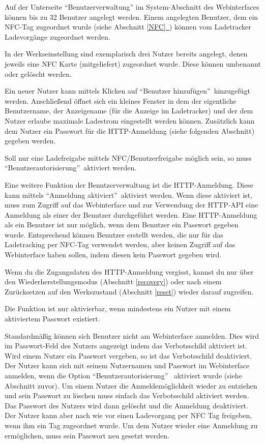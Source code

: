 \documentclass[a4paper,10pt]{article}
\newcommand{\hint}[1]{\begin{tcolorbox}[colback=boxgray,colframe=black,coltext=
white,title=Hinweis,left*=2mm,right*=2mm,boxsep=1mm,bottom=1mm,top=1mm]#1\end{tcolorbox}}
\newcommand*{\fullref}[1]{Abschnitt \hyperref[{#1}]{\ref*{#1}~\nameref*{#1}}}
\begin{document}
\begin{multicols*}{2}
    Auf der Unterseite \enquote{Benutzerverwaltung} im System-Abschnitt des Webinterfaces können bis zu 32 Benutzer angelegt werden.
    Einem angelegten Benutzer, dem ein NFC-Tag zugeordnet wurde (siehe \fullref{NFC}) können vom Ladetracker Ladevorgänge zugeordnet werden.

    In der Werkseinstellung sind exemplarisch drei Nutzer bereits angelegt,
    denen jeweils eine NFC Karte (mitgeliefert) zugeordnet wurde. Diese können
    umbenannt oder gelöscht werden.

    Ein neuer Nutzer kann mittels Klicken auf \enquote{Benutzer hinzufügen}~hinzugefügt werden.
    Anschließend öffnet sich ein kleines Fenster in dem der eigentliche Benutzername, der Anzeigename (für die Anzeige im Ladetracker)
    und der dem Nutzer erlaube maximale Ladestrom eingestellt werden können.
    Zusätzlich kann dem Nutzer ein Passwort für die HTTP-Anmeldung (siehe
    folgenden Abschnitt) gegeben werden.

    Soll nur eine Ladefreigabe mittels NFC/Benutzerfreigabe möglich sein, so
    muss \enquote{Benutzerautorisierung}~aktiviert werden.

    Eine weitere Funktion der Benutzerverwaltung ist die HTTP-Anmeldung. Diese
    kann mittels \enquote{Anmeldung aktiviert}~aktiviert werden. Wenn diese aktiviert ist, muss zum Zugriff auf das Webinterface und zur Verwendung
    der HTTP-API eine Anmeldung als einer der Benutzer durchgeführt werden. Eine HTTP-Anmeldung als ein Benutzer ist nur möglich, wenn
    dem Benutzer ein Passwort gegeben wurde. Entsprechend können Benutzer erstellt werden, die nur für das Ladetracking per NFC-Tag
    verwendet werden, aber keinen Zugriff auf das Webinterface haben sollen,
	indem diesen kein Passwort gegeben wird.
    \hint{Wenn du die Zugangsdaten des HTTP-Anmeldung vergisst, kannst du nur
    über den Wiederherstellungsmodus (Abschnitt \ref{recovery}) oder nach einem
    Zurücksetzen auf den Werkszustand (Abschnitt \ref{reset}) wieder darauf zugreifen.}
    Die Funktion ist nur aktivierbar, wenn mindestens ein Nutzer mit einem
    aktiviertem Passwort existiert.

    Standardmäßig können sich Benutzer nicht am Webinterface anmelden. Dies wird
    im Passwort-Feld des Nutzers angezeigt indem das Verbotsschild aktiviert
    ist. Wird einem Nutzer ein Passwort vergeben, so ist das Verbotsschild
    deaktiviert. Der Nutzer kann sich mit seinem Nutzernamen und Passwort im
    Webinterface anmelden, wenn die Option \enquote{Benutzerautorisierung}
    ~aktiviert wurde (siehe Abschnitt zuvor).
    Um einem Nutzer die Anmeldemöglichkeit wieder zu entziehen und sein Passwort
    zu löschen muss einfach das Verbotsschild aktiviert werden. Das Passwort des
    Nutzers wird dann gelöscht und die Anmeldung deaktiviert. Der Nutzer kann
    aber nach wie vor einen Ladevorgang per NFC Tag freigeben, wenn ihm ein Tag
    zugeordnet wurde. Um dem Nutzer wieder eine Anmeldung zu ermöglichen, muss
    sein Passwort neu gesetzt werden.


\end{multicols*}
\end{document}

